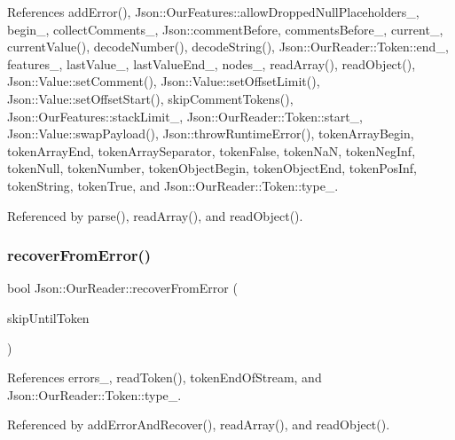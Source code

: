 References add\+Error(), Json\+::\+Our\+Features\+::allow\+Dropped\+Null\+Placeholders\+\_\+, begin\+\_\+, collect\+Comments\+\_\+, Json\+::comment\+Before, comments\+Before\+\_\+, current\+\_\+, current\+Value(), decode\+Number(), decode\+String(), Json\+::\+Our\+Reader\+::\+Token\+::end\+\_\+, features\+\_\+, last\+Value\+\_\+, last\+Value\+End\+\_\+, nodes\+\_\+, read\+Array(), read\+Object(), Json\+::\+Value\+::set\+Comment(), Json\+::\+Value\+::set\+Offset\+Limit(), Json\+::\+Value\+::set\+Offset\+Start(), skip\+Comment\+Tokens(), Json\+::\+Our\+Features\+::stack\+Limit\+\_\+, Json\+::\+Our\+Reader\+::\+Token\+::start\+\_\+, Json\+::\+Value\+::swap\+Payload(), Json\+::throw\+Runtime\+Error(), token\+Array\+Begin, token\+Array\+End, token\+Array\+Separator, token\+False, token\+NaN, token\+Neg\+Inf, token\+Null, token\+Number, token\+Object\+Begin, token\+Object\+End, token\+Pos\+Inf, token\+String, token\+True, and Json\+::\+Our\+Reader\+::\+Token\+::type\+\_\+.



Referenced by parse(), read\+Array(), and read\+Object().

\mbox{\label{classJson_1_1OurReader_a035651f0700a76a815e5f904c63ebb1c_a035651f0700a76a815e5f904c63ebb1c}} 
\subsubsection{\texorpdfstring{recover\+From\+Error()}{recoverFromError()}}
{\footnotesize\ttfamily bool Json\+::\+Our\+Reader\+::recover\+From\+Error (\begin{DoxyParamCaption}\item[{\hyperlink{classJson_1_1OurReader_a15116f7276ddf1e7a2cc3cbefa884dcc_a15116f7276ddf1e7a2cc3cbefa884dcc}{Token\+Type}}]{skip\+Until\+Token }\end{DoxyParamCaption})\hspace{0.3cm}{\ttfamily [private]}}



References errors\+\_\+, read\+Token(), token\+End\+Of\+Stream, and Json\+::\+Our\+Reader\+::\+Token\+::type\+\_\+.



Referenced by add\+Error\+And\+Recover(), read\+Array(), and read\+Object().

